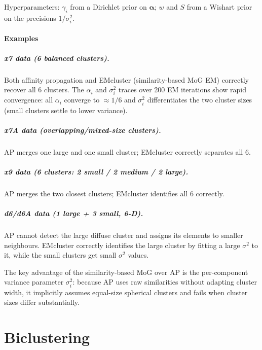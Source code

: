 \documentclass[11pt, oneside]{book}
\begin{document}
Hyperparameters: $\gamma_i$ from a Dirichlet prior on $\bm{\alpha}$;
$w$ and $S$ from a Wishart prior on the precisions $1/\sigma_i^2$.

\subsubsection{Examples}

\paragraph{x7 data (6 balanced clusters).}
Both affinity propagation and EMcluster (similarity-based MoG EM) correctly
recover all 6 clusters.
The $\alpha_i$ and $\sigma_i^2$ traces over 200 EM iterations show rapid
convergence: all $\alpha_i$ converge to $\approx 1/6$ and $\sigma_i^2$
differentiates the two cluster sizes (small clusters settle to lower variance).

\paragraph{x7A data (overlapping/mixed-size clusters).}
AP merges one large and one small cluster; EMcluster correctly separates all 6.

\paragraph{x9 data (6 clusters: 2 small / 2 medium / 2 large).}
AP merges the two closest clusters; EMcluster identifies all 6 correctly.

\paragraph{d6/d6A data (1 large + 3 small, 6-D).}
AP cannot detect the large diffuse cluster and assigns its elements to
smaller neighbours.
EMcluster correctly identifies the large cluster by fitting a large $\sigma^2$
to it, while the small clusters get small $\sigma^2$ values.

The key advantage of the similarity-based MoG over AP is the per-component
variance parameter $\sigma_i^2$: because AP uses raw similarities without
adapting cluster width, it implicitly assumes equal-size spherical clusters
and fails when cluster sizes differ substantially.


\chapter{Biclustering}
\end{document}
